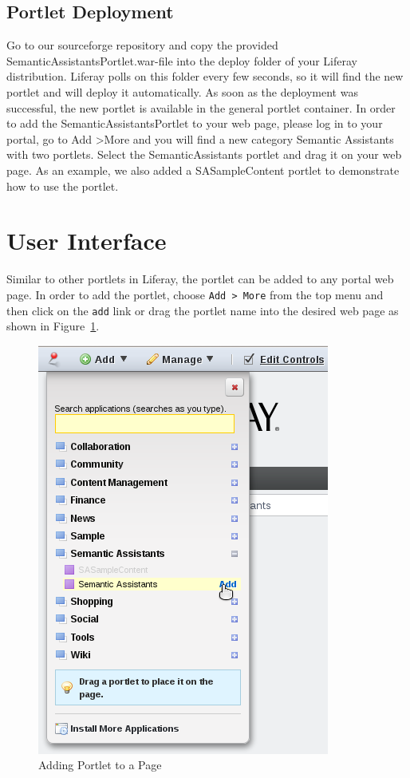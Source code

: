 \subsection{\sa Portlet Deployment}
Go to our sourceforge repository and copy the provided SemanticAssistantsPortlet.war-file into the deploy folder of your Liferay distribution. Liferay polls on this folder every few seconds, so it will find the new portlet and will deploy it automatically. As soon as the deployment was successful, the new portlet is available in the general portlet container. In order to add the SemanticAssistantsPortlet to your web page, please log in to your portal, go to Add \textgreater More and you will find a new category Semantic Assistants with two portlets. Select the SemanticAssistants portlet and drag it on your web page. As an example, we also added a SASampleContent portlet to demonstrate how to use the \sa portlet.


\section{User Interface}

Similar to other portlets in Liferay, the \sa portlet can be added to any portal web page. In order to add the \sa portlet, choose \texttt{Add \textgreater~More} from the top menu and then click on the \texttt{add} link or drag the portlet name into the desired web page as shown in Figure~\ref{fig:liferay_add_portlet}.

\begin{figure}
\centering
\includegraphics[scale=0.6]{pictures/liferay_add_portlet.png}
\caption{Adding \sa Portlet to a Page}
\label{fig:liferay_add_portlet}
\end{figure}

